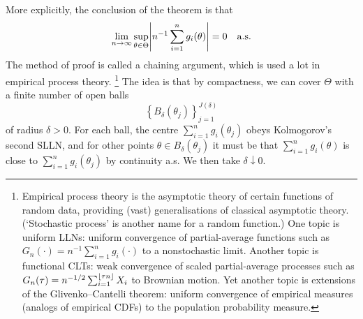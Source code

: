 \documentclass[11pt,letterpaper,reqno,oneside]{article}
\begin{document}
More explicitly, the conclusion of the theorem is that
%
\begin{equation*}
	\lim_{n\to\infty} \sup_{\theta \in \Theta}
	\abs*{ n^{-1} \sum_{i=1}^n g_i(\theta) }
	= 0
	\quad\text{a.s.}
\end{equation*}
%
The method of proof is called a chaining argument, which is used a lot in empirical process theory.%
	\footnote{Empirical process theory is the asymptotic theory of certain functions of random data, providing (vast) generalisations of classical asymptotic theory. (`Stochastic process' is another name for a random function.) One topic is uniform LLNs: uniform convergence of partial-average functions such as $G_n(\cdot)=n^{-1}\sum_{i=1}^n g_i(\cdot)$ to a nonstochastic limit. Another topic is functional CLTs: weak convergence of scaled partial-average processes such as $G_n(\tau) = n^{-1/2} \sum_{i=1}^{\lfloor\tau n\rfloor} X_i$ to Brownian motion. Yet another topic is extensions of the Glivenko--Cantelli theorem: uniform convergence of empirical measures (analogs of empirical CDFs) to the population probability measure.}
The idea is that by compactness, we can cover $\Theta$ with a finite number of open balls
%
\begin{equation*}
	\left\{ B_\delta(\theta_j) \right\}_{j=1}^{J(\delta)}
\end{equation*}
%
of radius $\delta>0$. For each ball, the centre $\sum_{i=1}^n g_i(\theta_j)$ obeys Kolmogorov's second SLLN, and for other points $\theta \in B_\delta(\theta_j)$ it must be that $\sum_{i=1}^n g_i(\theta)$ is close to $\sum_{i=1}^n g_i(\theta_j)$ by continuity a.s. We then take $\delta \downarrow 0$.
\end{document}

